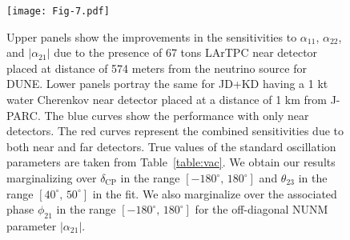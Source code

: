 \documentclass[11pt,a4paper]{article}
\newcommand{\capdef}{}
\newcommand{\mycaption}[2][\capdef]{\renewcommand{\capdef}{#2}
	\caption[#1]{{\footnotesize #2}}}
\begin{document}
\begin{figure}[h!]
\centering
\texttt{[image: Fig-7.pdf]}
\mycaption{Upper panels show the improvements in the sensitivities to $\alpha_{11}$, $\alpha_{22}$, and $|\alpha_{21}|$ due to the presence of 67 tons LArTPC near detector placed at distance of 574 meters from the neutrino source for DUNE. Lower panels portray the same for JD+KD having a 1 kt water Cherenkov  near detector placed at a distance of 1 km from J-PARC. The blue curves show the performance with only near detectors. The red curves represent the combined sensitivities due to both near and far detectors. True values of the standard oscillation parameters are taken from Table~\ref{table:vac}.
We obtain our results marginalizing over $\delta_{\mathrm{CP}}$ in the range $[-180^{\circ},\,180^{\circ}]$ and $\theta_{23}$ in the range $[40^{\circ},\,50^{\circ}]$ in the fit. We also marginalize over the associated phase $\phi_{21}$ in the range $[-180^{\circ},\,180^{\circ}]$ for the off-diagonal NUNM parameter $|\alpha_{21}|$.}
\label{fig:ND-DUNE}
\end{figure}
\end{document}
